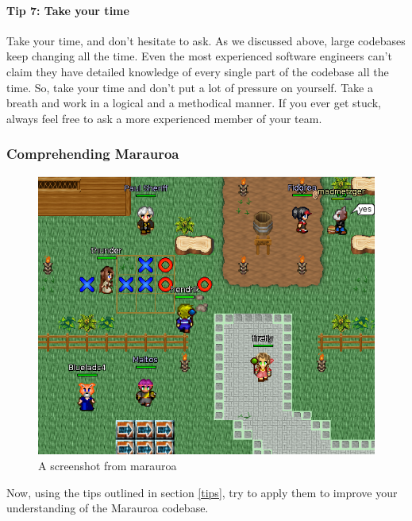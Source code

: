 \documentclass[
]{book}
\begin{document}
\hypertarget{tip7}{%
\paragraph{Tip 7: Take your time}\label{tip7}}

Take your time, and don't hesitate to ask. As we discussed above, large codebases keep changing all the time. Even the most experienced software engineers can't claim they have detailed knowledge of every single part of the codebase all the time. So, take your time and don't put a lot of pressure on yourself. Take a breath and work in a logical and a methodical manner. If you ever get stuck, always feel free to ask a more experienced member of your team.

\hypertarget{comprehension}{%
\subsubsection{Comprehending Marauroa}\label{comprehension}}

\begin{figure}

{\centering \includegraphics[width=1\linewidth]{images/marauroa2} 

}

\caption{A screenshot from marauroa}\label{fig:marauroa2-fig}
\end{figure}

Now, using the tips outlined in section \ref{tips}, try to apply them to improve your understanding of the Marauroa codebase.
\end{document}

